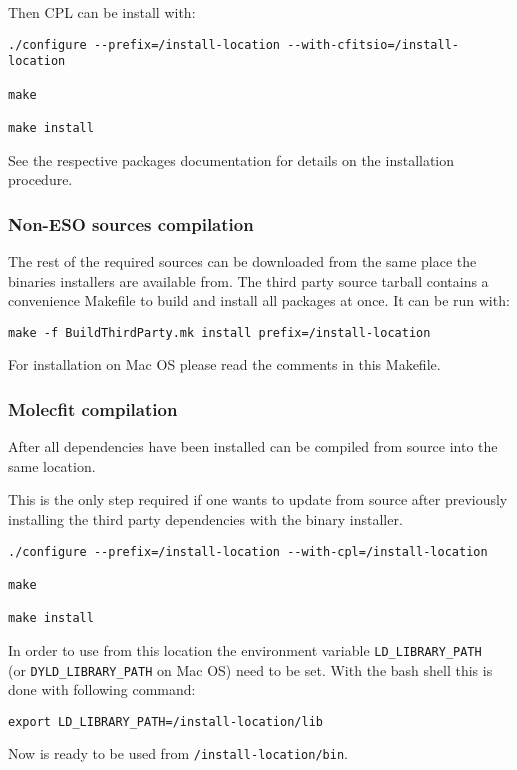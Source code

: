 Then CPL can be install with:

\begin{verbatim}
./configure --prefix=/install-location --with-cfitsio=/install-location

make

make install
\end{verbatim}

See the respective packages documentation for details on the
installation procedure.

\subsubsection{Non-ESO sources compilation}

The rest of the required sources can be downloaded from the same place
the \mf{} binaries installers are available from. The third party
source tarball contains a convenience Makefile to build and install all
packages at once. It can be run with:

\begin{verbatim}
make -f BuildThirdParty.mk install prefix=/install-location
\end{verbatim}

For installation on Mac OS please read the comments in this Makefile.

\subsubsection{Molecfit compilation}

After all dependencies have been installed \mf{} can be compiled from
source into the same location.

This is the only step required if one wants to update \mf{} from
source after previously installing the third party dependencies with the
binary installer.

\begin{verbatim}
./configure --prefix=/install-location --with-cpl=/install-location

make

make install
\end{verbatim}

In order to use \mf{} from this location the environment variable
{\tt LD\_LIBRARY\_PATH} \\(or {\tt DYLD\_LIBRARY\_PATH} on Mac OS) need to be
set. With the bash shell this is done with following command:

\begin{verbatim}
export LD_LIBRARY_PATH=/install-location/lib
\end{verbatim}

Now \mf{} is ready to be used from {\tt /install-location/bin}.
